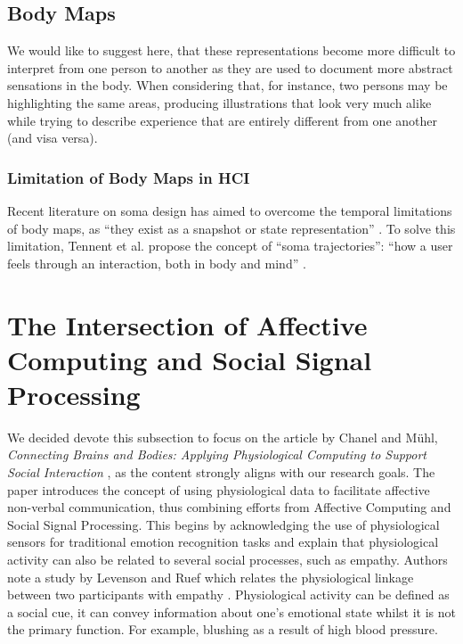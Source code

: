 \subsection{Body Maps}

 We would like to suggest here, that these representations become more difficult to interpret from one person to another as they are used to document more abstract sensations in the body. When considering that, for instance, two persons may be highlighting the same areas, producing illustrations that look very much alike while trying to describe experience that are entirely different from one another (and visa versa).
 
 \subsubsection{Limitation of Body Maps in HCI}
 Recent literature on soma design has aimed to overcome the temporal limitations of body maps, as “they exist as a snapshot or state representation” \cite{tennent_articulating_2021}. To solve this limitation, Tennent et al. propose the concept of “soma trajectories”: “how a user feels through an interaction, both in body and mind” \cite{tennent_articulating_2021}.

\section{The Intersection of Affective Computing and Social Signal Processing}
\label{lit_reivew:ssp}

We decided devote this subsection to focus on the article by Chanel and Mühl, \textit{Connecting Brains and Bodies: Applying Physiological Computing to Support Social Interaction} \cite{chanel_connecting_2015}, as the content strongly aligns with our research goals. The paper introduces the concept of using physiological data to facilitate affective non-verbal communication, thus combining efforts from Affective Computing and Social Signal Processing.  This begins by acknowledging the use of physiological sensors for traditional emotion recognition tasks and explain that physiological activity can also be related to several social processes, such as empathy. Authors note a study by Levenson and Ruef which relates the physiological linkage between two participants with empathy \cite{levenson_empathy_1992}. Physiological activity can be defined as a social cue, it can convey information about one's emotional state whilst it is not the primary function. For example, blushing as a result of high blood pressure.

